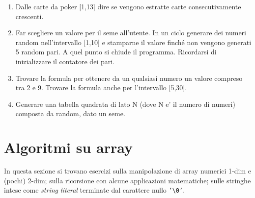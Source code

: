 \documentclass{article}
\begin{document}
\begin{enumerate}
\item Dalle carte da poker [1,13] dire se vengono estratte carte consecutivamente crescenti.

\item Far scegliere un valore per il seme all’utente. In un ciclo generare dei numeri random nell’intervallo [1,10] e stamparne il valore finché non vengono generati 5 random pari. A quel punto si chiude il programma. Ricordarsi di inizializzare il contatore dei pari.

\item Trovare la formula per ottenere da un qualsiasi numero un valore compreso tra 2 e 9. Trovare la formula anche per l'intervallo [5,30].

\item Generare una tabella quadrata di lato N (dove N e' il numero di numeri) composta da random, dato un seme.
\end{enumerate}

\section{Algoritmi su array}

In questa sezione si trovano esercizi sulla manipolazione di array numerici 1-dim e (pochi) 2-dim; sulla ricorsione con alcune applicazioni matematiche; sulle stringhe intese come \emph{string literal} terminate dal carattere nullo \texttt{'\textbackslash 0'}.
\end{document}
